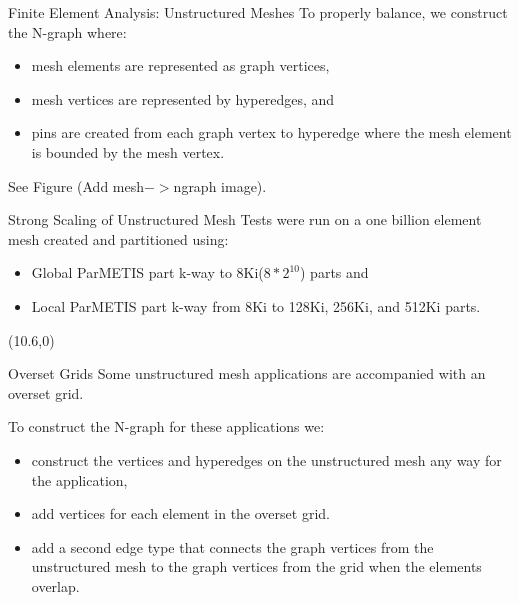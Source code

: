 \documentclass{beamer}
\begin{document}
\begin{textblock}{15.6}
\begin{textblock}{5}
\begin{block}{Finite Element Analysis: Unstructured Meshes}
      To properly balance, we construct the N-graph where:
      \begin{itemize}
      \item mesh elements are represented as graph vertices,
      \item mesh vertices are represented by hyperedges, and
      \item pins are created from each graph vertex to hyperedge where the mesh element is bounded by the mesh vertex.
      \end{itemize}
      See Figure (Add mesh$->$ngraph image).

    \end{block}
    \begin{block}{Strong Scaling of Unstructured Mesh}
      Tests were run on a one billion element mesh created and partitioned using:
      \begin{itemize}
      \item Global ParMETIS part k-way to 8Ki($8*2^{10}$) parts and
      \item Local ParMETIS part k-way from 8Ki to 128Ki, 256Ki, and 512Ki parts.
      \end{itemize}

    \end{block}
  \end{textblock}
  \begin{textblock}{5}(10.6,0)
    \begin{block}{Overset Grids}
      Some unstructured mesh applications are accompanied with an overset grid.

      
      To construct the N-graph for these applications we:
      \begin{itemize}
      \item construct the vertices and hyperedges on the unstructured mesh any way for the application,
      \item add vertices for each element in the overset grid.
      \item add a second edge type that connects the graph vertices from the unstructured mesh to the graph vertices from the grid when the elements overlap.
      \end{itemize}


\end{block}
\end{textblock}
\end{textblock}
\end{document}

